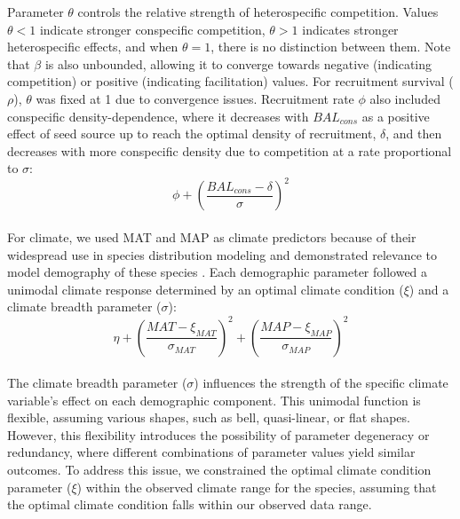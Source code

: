 Parameter \(\theta\) controls the relative strength of heterospecific
competition. Values \(\theta < 1\) indicate stronger conspecific
competition, \(\theta > 1\) indicates stronger heterospecific effects,
and when \(\theta = 1\), there is no distinction between them. Note that
\(\beta\) is also unbounded, allowing it to converge towards negative
(indicating competition) or positive (indicating facilitation) values.
For recruitment survival (\(\rho\)), \(\theta\) was fixed at 1 due to
convergence issues. Recruitment rate \(\phi\) also included conspecific
density-dependence, where it decreases with \(BAL_{cons}\) as a positive
effect of seed source up to reach the optimal density of recruitment,
\(\delta\), and then decreases with more conspecific density due to
competition at a rate proportional to \(\sigma\):\\

\begin{equation}
\phi + \left(\frac{BAL_{cons} - \delta}{\sigma}\right)^2
\label{eq:compingrowth}\end{equation}\\

For climate, we used MAT and MAP as climate predictors because of their
widespread use in species distribution modeling and demonstrated
relevance to model demography of these species \citep{LeSquin2021}. Each
demographic parameter followed a unimodal climate response determined by
an optimal climate condition (\(\xi\)) and a climate breadth parameter
(\(\sigma\)):\\

\begin{equation}
\eta + \left(\frac{MAT - \xi_{MAT}}{\sigma_{MAT}}\right)^2 + \left(\frac{MAP - \xi_{MAP}}{\sigma_{MAP}}\right)^2
\label{eq:climEffect}\end{equation}\\

The climate breadth parameter (\(\sigma\)) influences the strength of
the specific climate variable's effect on each demographic component.
This unimodal function is flexible, assuming various shapes, such as
bell, quasi-linear, or flat shapes. However, this flexibility introduces
the possibility of parameter degeneracy or redundancy, where different
combinations of parameter values yield similar outcomes. To address this
issue, we constrained the optimal climate condition parameter (\(\xi\))
within the observed climate range for the species, assuming that the
optimal climate condition falls within our observed data range.\\

